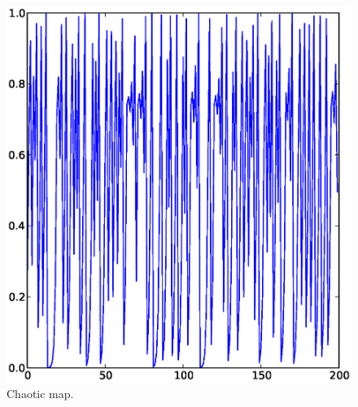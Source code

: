 \documentclass[12pt,twoside,draft]{book}
\begin{document}
\begin{figure}[h]
  \begin{center}
    \includegraphics[scale=0.5]{logistic_map_mu4_x02}
  \end{center}
  \caption{
    Chaotic map.
  }
  \label{fig:logistic_map_chaotic}
\end{figure}
\end{document}

